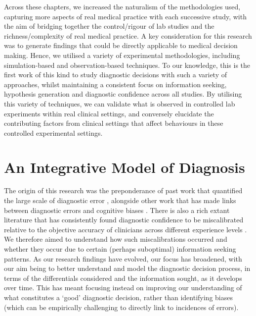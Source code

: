 \documentclass[a4paper, nobind]{templates/ociamthesis}
\begin{document}
Across these chapters, we increased the naturalism of the methodologies used, capturing more aspects of real medical practice with each successive study, with the aim of bridging together the control/rigour of lab studies and the richness/complexity of real medical practice. A key consideration for this research was to generate findings that could be directly applicable to medical decision making. Hence, we utilised a variety of experimental methodologies, including simulation-based and observation-based techniques. To our knowledge, this is the first work of this kind to study diagnostic decisions with such a variety of approaches, whilst maintaining a consistent focus on information seeking, hypothesis generation and diagnostic confidence across all studies. By utilising this variety of techniques, we can validate what is observed in controlled lab experiments within real clinical settings, and conversely elucidate the contributing factors from clinical settings that affect behaviours in these controlled experimental settings.

\section{An Integrative Model of Diagnosis}\label{an-integrative-model-of-diagnosis}

The origin of this research was the preponderance of past work that quantified the large scale of diagnostic error \autocite{kohn_errors_2000,mcglynn_measurement_2015}, alongside other work that has made links between diagnostic errors and cognitive biases \autocite{crowley_automated_2013,restrepo_annals_2020}. There is also a rich extant literature that has consistently found diagnostic confidence to be miscalibrated relative to the objective accuracy of clinicians across different experience levels \autocite{friedman_are_2001,yang_effect_2012,meyer_physicians_2013}. We therefore aimed to understand how such miscalibrations occurred and whether they occur due to certain (perhaps suboptimal) information seeking patterns. As our research findings have evolved, our focus has broadened, with our aim being to better understand and model the diagnostic decision process, in terms of the differentials considered and the information sought, as it develops over time. This has meant focusing instead on improving our understanding of what constitutes a `good' diagnostic decision, rather than identifying biases (which can be empirically challenging to directly link to incidences of errors).\\
\end{document}
